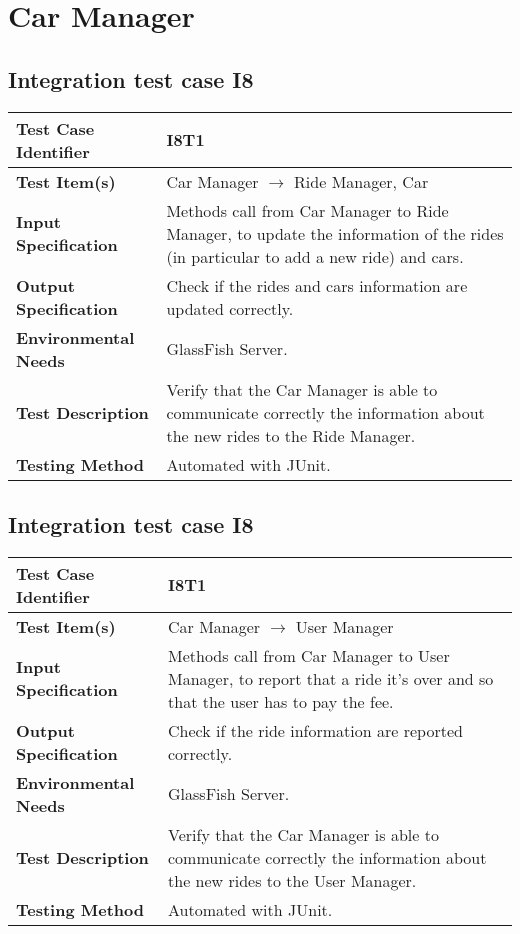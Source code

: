 \section{Car Manager}
\subsection{Integration test case I8}
\begin{tabular}{l p{}}
    \hline
    \textbf{Test Case Identifier} & I8T1\\
    \hline
    \textbf{Test Item(s)} & Car Manager $\rightarrow$ Ride Manager, Car\\
    \hline
    \textbf{Input Specification} & Methods call from Car Manager to Ride Manager, to update the information of the rides (in particular to add a new ride) and cars.\\
    \hline
    \textbf{Output Specification} & Check if the rides and cars information are updated correctly.\\
    \hline
    \textbf{Environmental Needs} & GlassFish Server.\\
    \hline
    \textbf{Test Description} & Verify that the Car Manager is able to communicate correctly the information about the new rides to the Ride Manager.\\
    \hline
    \textbf{Testing Method} & Automated with JUnit.\\
    \hline
\end{tabular}

\subsection{Integration test case I8}

\begin{tabular}{l p{}}
    \hline
    \textbf{Test Case Identifier} & I8T1\\
    \hline
    \textbf{Test Item(s)} & Car Manager $\rightarrow$ User Manager\\
    \hline
    \textbf{Input Specification} & Methods call from Car Manager to User Manager, to report that a ride it's over and so that the user has to pay the fee.\\
    \hline
    \textbf{Output Specification} & Check if the ride information are reported correctly.\\
    \hline
    \textbf{Environmental Needs} & GlassFish Server.\\
    \hline
    \textbf{Test Description} & Verify that the Car Manager is able to communicate correctly the information about the new rides to the User Manager.\\
    \hline
    \textbf{Testing Method} & Automated with JUnit.\\
    \hline
\end{tabular}